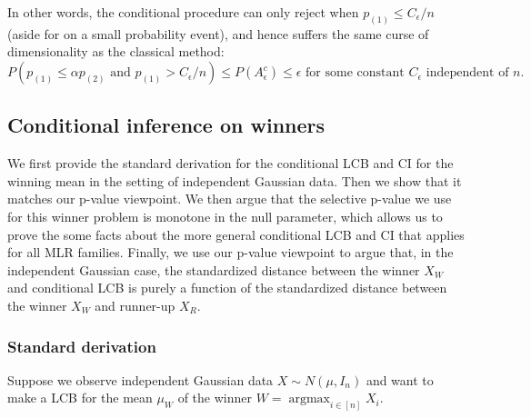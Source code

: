 \documentclass{article}
\DeclareMathOperator*{\argmax}{argmax}
\begin{document}
\begin{appendix}
In other words, the conditional procedure can only reject when $p_{(1)} \leq C_{\epsilon}/n$ (aside for on a small probability event), and hence suffers the same curse of dimensionality as the classical method:
\begin{equation*}
    P(p_{(1)} \leq \alpha p_{(2)} \text{ and } p_{(1)} > C_{\epsilon}/n) \leq P(A_{\epsilon}^c) \leq \epsilon \text{ for some constant } C_{\epsilon} \text{ independent of } n.  
\end{equation*}


\subsection{Conditional inference on winners}
\label{sec:cond_appdx}

We first provide the standard derivation for the conditional LCB and CI for the winning mean in the setting of independent Gaussian data. Then we show that it matches our p-value viewpoint. We then argue that the selective p-value we use for this winner problem is monotone in the null parameter, which allows us to prove the some facts about the more general conditional LCB and CI that applies for all MLR families. Finally, we use our p-value viewpoint to argue that, in the independent Gaussian case, the standardized distance between the winner $X_W$ and conditional LCB is purely a function of the standardized distance between the winner $X_W$ and runner-up $X_R$. 

\subsubsection{Standard derivation}

Suppose we observe independent Gaussian data $X \sim N(\mu, I_n)$ and want to make a LCB for the mean $\mu_W$ of the winner $W = \argmax_{i \in [n]} X_i$. 


\end{appendix}
\end{document}
